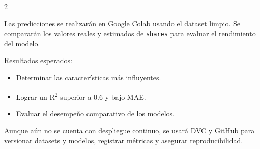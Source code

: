 \documentclass[12pt]{article}
\begin{document}
\begin{multicols}{2}
\begin{tcolorbox}[colback=CanvasGray,colframe=CanvasHeader,title=\textbf{Making Predictions}]
Las predicciones se realizarán en Google Colab usando el dataset limpio. 
Se compararán los valores reales y estimados de \texttt{shares} para evaluar el rendimiento del modelo.
\end{tcolorbox}

\columnbreak

\begin{tcolorbox}[colback=CanvasGray,colframe=CanvasHeader,title=\textbf{Impact Simulation}]
Resultados esperados:
\begin{itemize}
    \item Determinar las características más influyentes.
    \item Lograr un R\textsuperscript{2} superior a 0.6 y bajo MAE.
    \item Evaluar el desempeño comparativo de los modelos.
\end{itemize}
\end{tcolorbox}
\end{multicols}

\begin{tcolorbox}[colback=CanvasBlue!20,colframe=CanvasHeader,title=\textbf{Monitoring}]
Aunque aún no se cuenta con despliegue continuo, se usará DVC y GitHub para versionar datasets y modelos, registrar métricas y asegurar reproducibilidad.
\end{tcolorbox}
\end{document}
